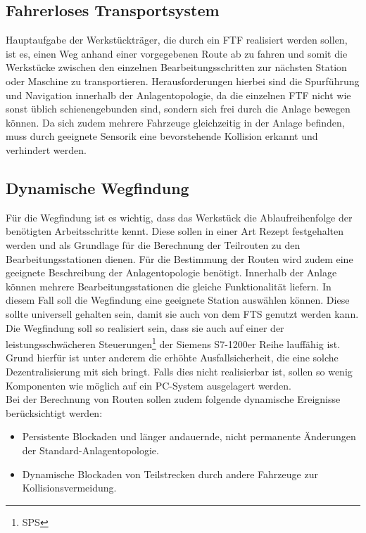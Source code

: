 \subsection{Fahrerloses Transportsystem}

	Hauptaufgabe der Werkstückträger, die durch ein \ac{FTF} realisiert werden sollen, ist es, einen Weg anhand einer vorgegebenen Route ab zu fahren und somit die Werkstücke zwischen den einzelnen Bearbeitungsschritten zur nächsten Station oder Maschine zu transportieren. Herausforderungen hierbei sind die Spurführung und Navigation innerhalb der Anlagentopologie, da die einzelnen \ac{FTF} nicht wie sonst üblich schienengebunden sind, sondern sich frei durch die Anlage bewegen können. Da sich zudem mehrere Fahrzeuge gleichzeitig in der Anlage befinden, muss durch geeignete Sensorik eine bevorstehende Kollision erkannt und verhindert werden.
	
\subsection{Dynamische Wegfindung}
	\label{Aufgabenstellung_Pathfinding}
	Für die Wegfindung ist es wichtig, dass das Werkstück die Ablaufreihenfolge der benötigten Arbeitsschritte kennt. Diese sollen in einer Art Rezept festgehalten werden und als Grundlage für die Berechnung der Teilrouten zu den Bearbeitungsstationen dienen. Für die Bestimmung der Routen wird zudem eine geeignete Beschreibung der Anlagentopologie benötigt. Innerhalb der Anlage können mehrere Bearbeitungsstationen die gleiche Funktionalität liefern. In diesem Fall soll die Wegfindung eine geeignete Station auswählen können. Diese sollte universell gehalten sein, damit sie auch von dem \ac{FTS} genutzt werden kann. Die Wegfindung soll so realisiert sein, dass sie auch auf einer der leistungsschwächeren Steuerungen\footnote{\ac{SPS}} der Siemens S7-1200er Reihe lauffähig ist. Grund hierfür ist unter anderem die erhöhte Ausfallsicherheit, die eine solche Dezentralisierung mit sich bringt. Falls dies nicht realisierbar ist, sollen so wenig Komponenten wie möglich auf ein PC-System ausgelagert werden.
	\\[4pt]
	Bei der Berechnung von Routen sollen zudem folgende dynamische Ereignisse berücksichtigt werden:
	\begin{itemize}
		\item Persistente Blockaden und länger andauernde, nicht permanente Änderungen der Standard-Anlagentopologie.
		\item Dynamische Blockaden von Teilstrecken durch andere Fahrzeuge zur Kollisionsvermeidung.
	\end{itemize}
	
